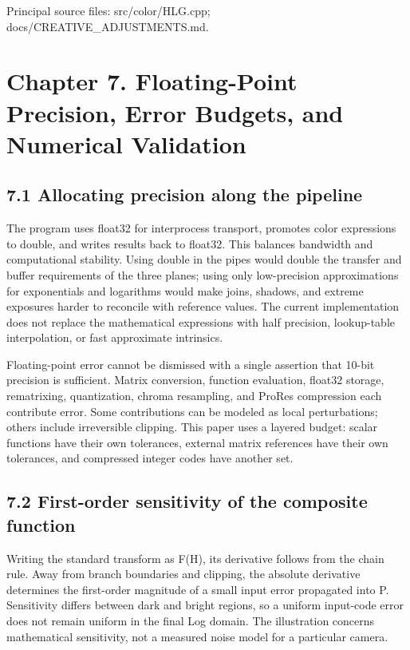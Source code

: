 \documentclass[11pt,a4paper,openany]{book}
\begin{document}
\par\small Principal source files: src/color/HLG.cpp; docs/CREATIVE\_ADJUSTMENTS.md.\normalsize

\chapter*{Chapter 7. Floating-Point Precision, Error Budgets, and Numerical Validation}

\section*{7.1 Allocating precision along the pipeline}
The program uses float32 for interprocess transport, promotes color expressions to double, and writes results back to float32. This balances bandwidth and computational stability. Using double in the pipes would double the transfer and buffer requirements of the three planes; using only low-precision approximations for exponentials and logarithms would make joins, shadows, and extreme exposures harder to reconcile with reference values. The current implementation does not replace the mathematical expressions with half precision, lookup-table interpolation, or fast approximate intrinsics.

Floating-point error cannot be dismissed with a single assertion that 10-bit precision is sufficient. Matrix conversion, function evaluation, float32 storage, rematrixing, quantization, chroma resampling, and ProRes compression each contribute error. Some contributions can be modeled as local perturbations; others include irreversible clipping. This paper uses a layered budget: scalar functions have their own tolerances, external matrix references have their own tolerances, and compressed integer codes have another set.


\section*{7.2 First-order sensitivity of the composite function}
Writing the standard transform as F(H), its derivative follows from the chain rule. Away from branch boundaries and clipping, the absolute derivative determines the first-order magnitude of a small input error propagated into P. Sensitivity differs between dark and bright regions, so a uniform input-code error does not remain uniform in the final Log domain. The illustration concerns mathematical sensitivity, not a measured noise model for a particular camera.
\end{document}
